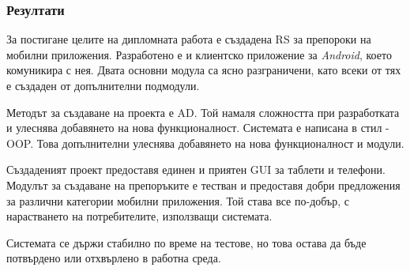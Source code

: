 \subsubsection{Резултати}

	За постигане целите на дипломната работа е създадена \ac{RS} за препороки на мобилни приложения. Разработено е и клиентско приложение за \emph{Android}, което комуникира с нея. Двата основни модула са ясно разграничени, като всеки от тях е създаден от допълнителни подмодули.
	
	Методът за създаване на проекта е \ac{AD}. Той намаля сложността при разработката и улеснява добавянето на нова функционалност. Системата е написана в стил - \ac{OOP}. Това допълнителни улеснява добавянето на нова функционалност и модули.
	
	Създаденият проект предоставя единен и приятен \ac{GUI} за таблети и телефони. Модулът за създаване на препоръките е тестван и предоставя добри предложения за различни категории мобилни приложения. Той става все по-добър, с нарастването на потребителите, използващи системата.
	
	Системата се държи стабилно по време на тестове, но това остава да бъде потвърдено или отхвърлено в работна среда.